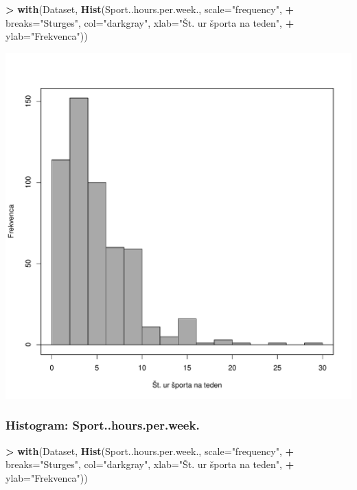 \documentclass[
]{article}
\newenvironment{Shaded}{\begin{snugshade}}{\end{snugshade}}
\newcommand{\AttributeTok}[1]{\textcolor[rgb]{0.13,0.29,0.53}{#1}}
\newcommand{\FunctionTok}[1]{\textcolor[rgb]{0.13,0.29,0.53}{\textbf{#1}}}
\newcommand{\NormalTok}[1]{#1}
\newcommand{\SpecialCharTok}[1]{\textcolor[rgb]{0.81,0.36,0.00}{\textbf{#1}}}
\newcommand{\StringTok}[1]{\textcolor[rgb]{0.31,0.60,0.02}{#1}}
\begin{document}
\begin{Shaded}
\begin{Highlighting}[]
\SpecialCharTok{\textgreater{}} \FunctionTok{with}\NormalTok{(Dataset, }\FunctionTok{Hist}\NormalTok{(Sport..hours.per.week., }\AttributeTok{scale=}\StringTok{"frequency"}\NormalTok{, }
\SpecialCharTok{+}   \AttributeTok{breaks=}\StringTok{"Sturges"}\NormalTok{, }\AttributeTok{col=}\StringTok{"darkgray"}\NormalTok{, }\AttributeTok{xlab=}\StringTok{"Št. ur športa na teden"}\NormalTok{, }
\SpecialCharTok{+}   \AttributeTok{ylab=}\StringTok{"Frekvenca"}\NormalTok{))}
\end{Highlighting}
\end{Shaded}

\includegraphics[width=750px]{RcmdrMarkdown_files/figure-latex/unnamed-chunk-9-1}

\subsubsection{Histogram:
Sport..hours.per.week.}\label{histogram-sport..hours.per.week.-2}

\begin{Shaded}
\begin{Highlighting}[]
\SpecialCharTok{\textgreater{}} \FunctionTok{with}\NormalTok{(Dataset, }\FunctionTok{Hist}\NormalTok{(Sport..hours.per.week., }\AttributeTok{scale=}\StringTok{"frequency"}\NormalTok{, }
\SpecialCharTok{+}   \AttributeTok{breaks=}\StringTok{"Sturges"}\NormalTok{, }\AttributeTok{col=}\StringTok{"darkgray"}\NormalTok{, }\AttributeTok{xlab=}\StringTok{"Št. ur športa na teden"}\NormalTok{, }
\SpecialCharTok{+}   \AttributeTok{ylab=}\StringTok{"Frekvenca"}\NormalTok{))}
\end{Highlighting}
\end{Shaded}
\end{document}
